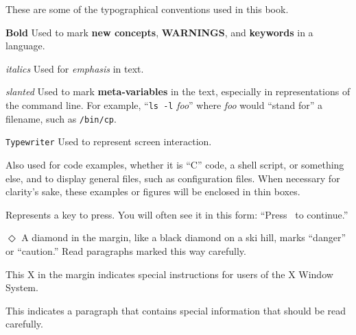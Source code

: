 
These are some of the typographical conventions used in this book.

\begin{dispitems}
\item [{\bf Bold}] Used to mark {\bf new concepts}, {\bf WARNINGS},
and {\bf keywords} in a language.

\item [{\em italics}] Used for {\em emphasis} in text. 

\item [{\sl slanted}] Used to mark {\bf meta-variables} in the text,
especially in representations of the command line.  For example,
``{\tt ls -l} {\sl foo}''
where {\sl foo\/} would ``stand for'' a filename, such as {\tt /bin/cp}.

\item [{\tt Typewriter}] Used to represent screen interaction.

Also used for code examples, whether it is ``C'' code, a shell script,
or something else, and to display general files, such as configuration
files.  When necessary for clarity's sake, these examples or figures
will be enclosed in thin boxes.

\item [\key{Key}] Represents a key to press.  You will often see it
in this form: ``Press \ret\ to continue.''

\item [\hfill$\Diamond$] A diamond in the margin, like a
black diamond on a ski hill, marks ``danger'' or ``caution.''  Read
paragraphs marked this way carefully.

\item [\hfill\usebox{\xlogo}] This X in the margin indicates special
  instructions for users of the X Window System.

\item [\hfill\usebox{\caution}] This indicates a paragraph that
  contains special information that should be read carefully.

\end{dispitems}
